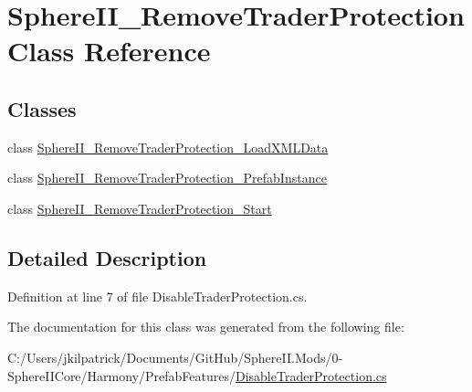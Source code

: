 \hypertarget{class_sphere_i_i___remove_trader_protection}{}\section{Sphere\+I\+I\+\_\+\+Remove\+Trader\+Protection Class Reference}
\label{class_sphere_i_i___remove_trader_protection}
\subsection*{Classes}
\begin{DoxyCompactItemize}
\item 
class \mbox{\hyperlink{class_sphere_i_i___remove_trader_protection_1_1_sphere_i_i___remove_trader_protection___load_x_m_l_data}{Sphere\+I\+I\+\_\+\+Remove\+Trader\+Protection\+\_\+\+Load\+X\+M\+L\+Data}}
\item 
class \mbox{\hyperlink{class_sphere_i_i___remove_trader_protection_1_1_sphere_i_i___remove_trader_protection___prefab_instance}{Sphere\+I\+I\+\_\+\+Remove\+Trader\+Protection\+\_\+\+Prefab\+Instance}}
\item 
class \mbox{\hyperlink{class_sphere_i_i___remove_trader_protection_1_1_sphere_i_i___remove_trader_protection___start}{Sphere\+I\+I\+\_\+\+Remove\+Trader\+Protection\+\_\+\+Start}}
\end{DoxyCompactItemize}


\subsection{Detailed Description}


Definition at line 7 of file Disable\+Trader\+Protection.\+cs.



The documentation for this class was generated from the following file\+:\begin{DoxyCompactItemize}
\item 
C\+:/\+Users/jkilpatrick/\+Documents/\+Git\+Hub/\+Sphere\+I\+I.\+Mods/0-\/\+Sphere\+I\+I\+Core/\+Harmony/\+Prefab\+Features/\mbox{\hyperlink{_disable_trader_protection_8cs}{Disable\+Trader\+Protection.\+cs}}\end{DoxyCompactItemize}
